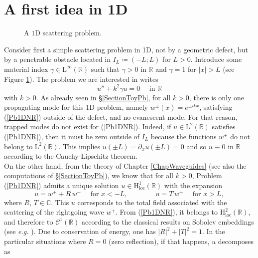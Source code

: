 \documentclass[11pt,a4paper]{report}
\newcommand{\mrm}[1]{\mathrm{#1}}
\newcommand{\Cplx}{\mathbb{C}}
\newcommand{\R}{\mathbb{R}}
\newcommand{\mL}{\mrm{L}}
\newcommand{\mH}{\mrm{H}}
\begin{document}
\section{A first idea in 1D} 
\begin{figure}[!ht]
\centering
{}
\caption{A $\mrm{1D}$ scattering problem. \label{Domain1DNR}} 
\end{figure}
\noindent Consider first a simple scattering problem in 1D, not by a geometric defect, but by a penetrable obstacle located in $I_L\coloneqq(-L;L)$ for $L>0$. Introduce some material index $\gamma\in\mL^{\infty}(\R)$ such that $\gamma>0$ in $\R$ and $\gamma=1$ for $|x|>L$ (see Figure \ref{Domain1DNR}). The problem we are interested in writes
\begin{equation}\label{Pb1DNR}
u''+k^2\gamma u=0\quad\mbox{ in }\R
\end{equation}
with $k>0$. As already seen in \S\ref{SectionToyPb}, for all $k>0$, there is only one propagating mode for this 1D problem, namely $w^\pm(x)=e^{\pm ikx}$, satisfying (\ref{Pb1DNR}) outside of the defect, and no evanescent mode. For that reason, trapped modes do not exist for (\ref{Pb1DNR}). Indeed, if $u\in\mL^2(\R)$ satisfies (\ref{Pb1DNR}), then it must be zero outside of $I_L$ because the functions $w^\pm$ do not belong to $\mL^2(\R)$. This implies $u(\pm L)=\partial_xu(\pm L)=0$ and so $u\equiv0$ in $\R$ according to the Cauchy-Lipschitz theorem.\\ 
\newline
On the other hand, from the theory of Chapter \ref{ChapWaveguides} (see also the computations of \S\ref{SectionToyPb}), we know that for all $k>0$, Problem (\ref{Pb1DNR}) admits a unique solution $u\in\mH^1_{\mrm{loc}}(\R)$ with the expansion 
\[
u=w^++R\,w^-\quad\mbox{ for }x<-L,\qquad\qquad u=T\,w^+\quad\mbox{ for }x>L,
\]
where $R$, $T\in\Cplx$. This $u$ corresponds to the total field associated with the scattering of the rightgoing wave $w^+$. From (\ref{Pb1DNR}), it belongs to $\mH^2_{\mrm{loc}}(\R)$, and therefore to $\mathscr{C}^1(\R)$ according to the classical results on Sobolev embeddings (see \textit{e.g.} \cite[Thm.\,8.8]{Brez11}). Due to conservation of energy, one has $|R|^2+|T|^2=1$.  In the particular situations where $R=0$ (zero reflection), if that happens, $u$ decomposes as 
\end{document}
